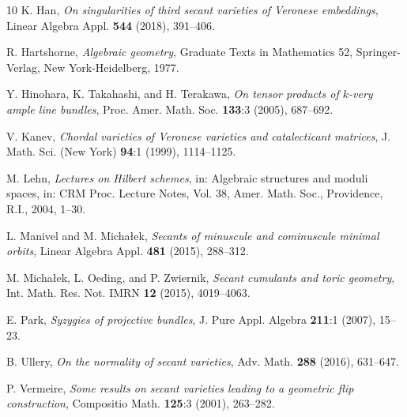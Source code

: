 \documentclass[a4paper]{amsart}
\numberwithin{equation}{section}
\theoremstyle{plain}
\theoremstyle{definition}
\theoremstyle{remark}
\numberwithin{figure}{section}
\numberwithin{table}{section}
\numberwithin{equation}{section}
\begin{document}
\begin{thebibliography}{10}
 K. Han, \textit{On singularities of third secant varieties of Veronese embeddings}, Linear Algebra Appl. \textbf{544} (2018), 391--406. 

 R. Hartshorne, \textit{Algebraic geometry}, Graduate Texts in Mathematics 52, Springer-Verlag, New York-Heidelberg, 1977.

 Y. Hinohara, K. Takahashi, and H. Terakawa, \textit{On tensor products of $k$-very ample line bundles}, Proc. Amer. Math. Soc. \textbf{133}:3 (2005), 687--692.

 V. Kanev, \textit{Chordal varieties of Veronese varieties and catalecticant matrices}, J. Math. Sci. (New York) \textbf{94}:1 (1999), 1114--1125.

 M. Lehn, \textit{Lectures on Hilbert schemes}, in: Algebraic structures and moduli spaces, in: CRM Proc. Lecture Notes, Vol. 38, Amer. Math. Soc., Providence, R.I., 2004, 1--30.

 L. Manivel and M. Micha{\l}ek, \textit{Secants of minuscule and cominuscule minimal orbits}, Linear Algebra Appl. \textbf{481} (2015), 288--312. 

 M. Micha{\l}ek, L. Oeding, and P. Zwiernik, \textit{Secant cumulants and toric geometry}, Int. Math. Res. Not. IMRN \textbf{12} (2015), 4019--4063.

 E. Park, \textit{Syzygies of projective bundles}, J. Pure Appl. Algebra \textbf{211}:1 (2007), 15--23. 

 B. Ullery, \textit{On the normality of secant varieties}, Adv. Math. \textbf{288} (2016), 631--647.

 P. Vermeire, \textit{Some results on secant varieties leading to a geometric flip construction}, Compositio Math. \textbf{125}:3 (2001), 263--282. 
\end{thebibliography}
\end{document}
